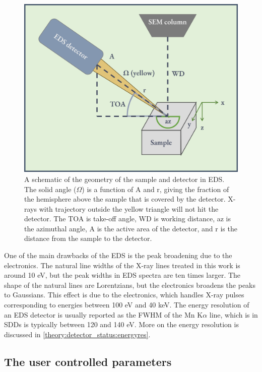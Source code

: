\begin{figure}[ht]
    \centering
    \includegraphics[width=0.6\linewidth]{figures/EDS_geometry.png}
    \caption{
        A schematic of the geometry of the sample and detector in EDS.
        The solid angle ($\Omega$) is a function of A and r, giving the fraction of the hemisphere above the sample that is covered by the detector.
        X-rays with trajectory outside the yellow triangle will not hit the detector.
        The TOA is take-off angle, WD is working distance, az is the azimuthal angle, A is the active area of the detector, and r is the distance from the sample to the detector.
    }
    \label{fig:eds_geometry}
\end{figure}






One of the main drawbacks of the EDS is the peak broadening due to the electronics.
The natural line widths of the X-ray lines treated in this work is around 10 eV, but the peak widths in EDS spectra are ten times larger.
The shape of the natural lines are Lorentzians, but the electronics broadens the peaks to Gaussians.
This effect is due to the electronics, which handles X-ray pulses corresponding to energies between 100 eV and 40 keV.
The energy resolution of an EDS detector is usually reported as the FWHM of the Mn K$\alpha$ line, which is in SDDs is typically between 120 and 140 eV.
More on the energy resolution is discussed in \cref{theory:detector_status:energyres}.








\clearpage



\subsection{The user controlled parameters}
\label{theory:eds:user_controlled_parameters}

